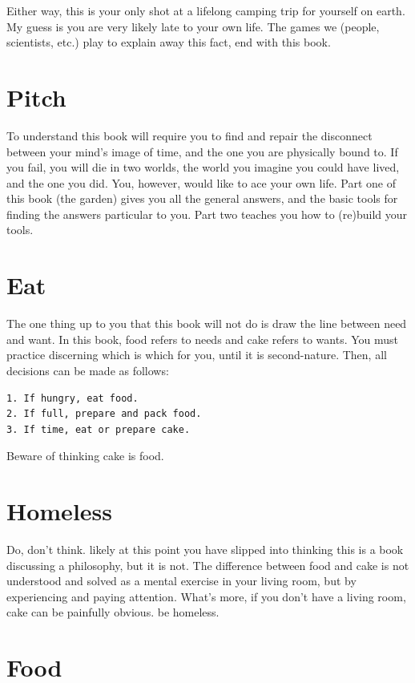 \documentclass[
]{book}
\begin{document}
Either way, this is your only shot at a lifelong camping trip for yourself on earth.
My guess is you are very likely late to your own life.
The games we (people, scientists, etc.) play to explain away this fact, end with this book.

\section{Pitch}\label{intro-pitch}

To understand this book will require you to find and repair the disconnect between your mind's image of time, and the one you are physically bound to.
If you fail, you will die in two worlds, the world you imagine you could have lived, and the one you did.
You, however, would like to ace your own life.
Part one of this book (the garden) gives you all the general answers, and the basic tools for finding the answers particular to you.
Part two teaches you how to (re)build your tools.

\section{Eat}\label{eat}

The one thing up to you that this book will not do is draw the line between need and want.
In this book, food refers to needs and cake refers to wants.
You must practice discerning which is which for you, until it is second-nature.
Then, all decisions can be made as follows:

\begin{verbatim}
1. If hungry, eat food.
2. If full, prepare and pack food.
3. If time, eat or prepare cake.
\end{verbatim}

Beware of thinking cake is food.

\section{Homeless}\label{homeless}

Do, don't think. likely at this point you have slipped into thinking this is a book discussing a philosophy, but it is not.
The difference between food and cake is not understood and solved as a mental exercise in your living room, but by experiencing and paying attention.
What's more, if you don't have a living room, cake can be painfully obvious. be homeless.

\section{Food}\label{food}
\end{document}
